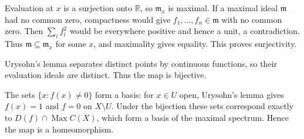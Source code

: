 Evaluation at $x$ is a surjection onto $\mathbb R$, so $\mathfrak m_x$ is maximal. If a maximal ideal $\mathfrak m$ had no common zero, compactness would give $f_1,\ldots,f_n\in\mathfrak m$ with no common zero. Then $\sum_i f_i^2$ would be everywhere positive and hence a unit, a contradiction. Thus $\mathfrak m\subseteq\mathfrak m_x$ for some $x$, and maximality gives equality. This proves surjectivity.

Urysohn's lemma separates distinct points by continuous functions, so their evaluation ideals are distinct. Thus the map is bijective.

The sets $\{x:f(x)\ne0\}$ form a basis: for $x\in U$ open, Urysohn's lemma gives $f(x)=1$ and $f=0$ on $X\setminus U$. Under the bijection these sets correspond exactly to $D(f)\cap\operatorname{Max}C(X)$, which form a basis of the maximal spectrum. Hence the map is a homeomorphism.
